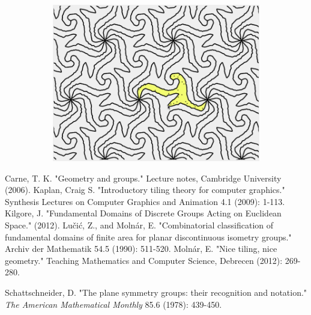 \documentclass[11pt]{article}
\begin{document}
\begin{figure}[H]
\begin{subfigure}[b]{0.33\textwidth}
  
  \end{subfigure}
  \begin{subfigure}[b]{0.33\textwidth}
    \includegraphics[width=.9\textwidth]{sl5.png}

  \end{subfigure}
  
\end{figure}


\begin{thebibliography}{99}
  Carne, T. K. "Geometry and groups." Lecture notes, Cambridge University (2006). 
   Kaplan, Craig S. "Introductory tiling theory for computer graphics."{} Synthesis Lectures on Computer Graphics and Animation 4.1 (2009): 1-113. 
   Kilgore, J. "Fundamental Domains of Discrete Groups Acting on Euclidean Space." (2012). 
  Lučić, Z., and Molnár, E. "{}Combinatorial classification of fundamental domains of finite area for planar discontinuous isometry groups." Archiv der Mathematik 54.5 (1990): 511-520.
 Molnár, E. "Nice tiling, nice geometry." Teaching Mathematics and Computer Science, Debrecen (2012): 269-280.


  Schattschneider, D. "The plane symmetry groups: their recognition
  and notation." \emph{The American Mathematical Monthly} 85.6 (1978):
  439-450.


\end{thebibliography}

    
    
    
    
\end{document}
